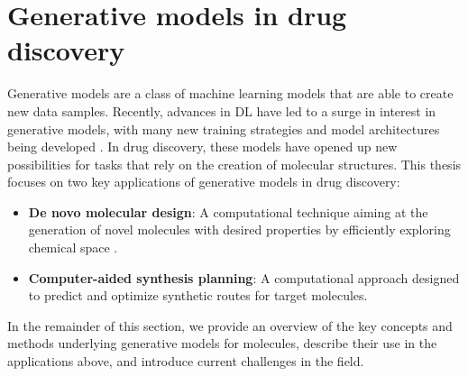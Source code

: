\section{Generative models in drug discovery}
Generative models are a class of machine learning models that are able to create new data samples.
Recently, advances in \ac{DL} have led to a surge in interest in generative models, with many new
training strategies and model architectures being developed
\citep{bond-taylorDeepGenerativeModelling2022,brownLanguageModelsAre2020,goodfellowGenerativeAdversarialNets2014,
    dinhDensityEstimationUsing2017,kingmaAutoEncodingVariationalBayes2013,hoDenoisingDiffusionProbabilistic2020,vaswaniAttentionAllYou2017}.
In drug discovery, these models have opened up new possibilities for tasks that rely on the creation
of molecular structures. This thesis focuses on two key applications of generative models in
drug discovery:
\begin{itemize}
    \item \textbf{De novo molecular design}: A computational technique aiming at the generation of
          novel molecules with desired properties by efficiently exploring chemical space
          \citep{schneiderNovoMolecularDesign2013}.
    \item \textbf{Computer-aided synthesis planning}: A computational approach designed to predict and optimize synthetic routes for
          target molecules.
\end{itemize}

In the remainder of this section, we provide an overview of the key concepts and methods underlying
generative models for molecules, describe their use in the applications above, and introduce current
challenges in the field.

